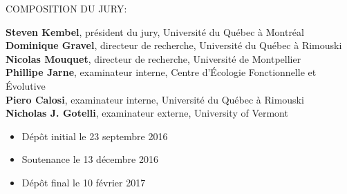 \thispagestyle{empty}

\null
\vfill
\noindent COMPOSITION DU JURY: \\

\begin{singlespace}
  \noindent \textbf{Steven Kembel}, président du jury, Université du Québec à Montréal\\

  \noindent \textbf{Dominique Gravel}, directeur de recherche, Université du Québec à Rimouski\\

  \noindent \textbf{Nicolas Mouquet}, directeur de recherche, Université de Montpellier\\

  \noindent \textbf{Phillipe Jarne}, examinateur interne, Centre d'Écologie Fonctionnelle et Évolutive\\

  \noindent \textbf{Piero Calosi}, examinateur interne, Université du Québec à Rimouski\\

  \noindent \textbf{Nicholas J. Gotelli}, examinateur externe, University of Vermont\\
\end{singlespace}

\vspace{1.5cm}

\begin{itemize}
\item Dépôt initial le 23 septembre 2016
\item Soutenance le 13 décembre 2016
\item Dépôt final le 10 février 2017
\end{itemize}



\cleardoublepage
